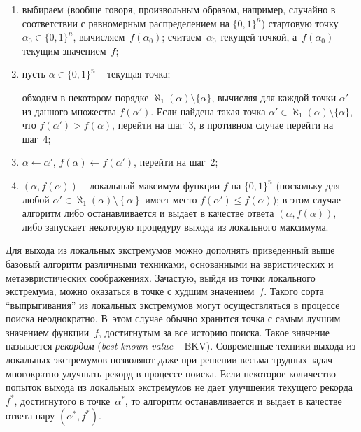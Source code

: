 \begin{enumerate}
\item
  выбираем (вообще говоря, произвольным образом, например, случайно в соответствии с равномерным распределением на $\{ 0,1 \}^{n}$) стартовую точку~$\alpha_{0} \in \{ 0,1 \}^{n}$, вычисляем~$f(\alpha_{0})$; считаем~$\alpha_{0}$ текущей точкой, а~$f(\alpha_{0})$ текущим значением~$f$;

\item
  пусть $\alpha \in \{ 0,1 \}^{n}$ \--- текущая точка;

  обходим в некотором порядке $\aleph_{1}(\alpha) \setminus \{ \alpha \}$, вычисляя для каждой точки $\alpha'$ из данного множества $f(\alpha')$. Если найдена такая точка $\alpha' \in \aleph_{1}(\alpha) \setminus \{ \alpha \}$, что $f(\alpha') > f(\alpha)$, перейти на шаг~3, в противном случае перейти на шаг~4;

\item
  $\alpha \gets \alpha'$, $f(\alpha) \gets f(\alpha')$, перейти на шаг~2;

\item
  $(\alpha,f(\alpha))$ \--- локальный максимум функции $f$ на $\{ 0,1 \}^{n}$ (поскольку для любой $\alpha' \in \aleph_{1}(\alpha) \setminus \left\{ \alpha \right\}$ имеет место $f(\alpha') \leq f(\alpha)$); в этом случае алгоритм либо останавливается и выдает в качестве ответа $(\alpha, f(\alpha))$, либо запускает некоторую процедуру выхода из локального максимума.
\end{enumerate}

Для выхода из локальных экстремумов можно дополнять приведенный выше базовый алгоритм различными техниками, основанными на эвристических и метаэвристических соображениях.
Зачастую, выйдя из точки локального экстремума, можно оказаться в точке с худшим значением~$f$.
Такого сорта \enquote{выпрыгивания} из локальных экстремумов могут осуществляться в процессе поиска неоднократно.
В~этом случае обычно хранится точка с самым лучшим значением функции~$f$, достигнутым за все историю поиска.
Такое значение называется \textit{рекордом} (\textit{best known value} \--- BKV).
Современные техники выхода из локальных экстремумов позволяют даже при решении весьма трудных задач многократно улучшать рекорд в процессе поиска.
Если некоторое количество попыток выхода из локальных экстремумов не дает улучшения текущего рекорда~$f^{*}$, достигнутого в точке~$\alpha^{*}$, то алгоритм останавливается и выдает в качестве ответа пару $(\alpha^{*}, f^{*})$.

